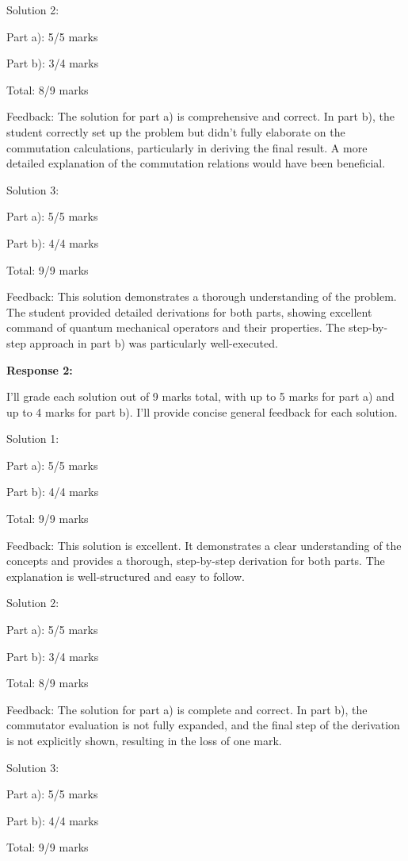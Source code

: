 \documentclass[a4paper,11pt]{article}
\begin{document}
Solution 2:

Part a): 5/5 marks

Part b): 3/4 marks

Total: 8/9 marks

Feedback: The solution for part a) is comprehensive and correct. In part b), the student correctly set up the problem but didn't fully elaborate on the commutation calculations, particularly in deriving the final result. A more detailed explanation of the commutation relations would have been beneficial.

Solution 3:

Part a): 5/5 marks

Part b): 4/4 marks

Total: 9/9 marks

Feedback: This solution demonstrates a thorough understanding of the problem. The student provided detailed derivations for both parts, showing excellent command of quantum mechanical operators and their properties. The step-by-step approach in part b) was particularly well-executed.

\bigskip   
\textbf{Response 2:}

I'll grade each solution out of 9 marks total, with up to 5 marks for part a) and up to 4 marks for part b). I'll provide concise general feedback for each solution.

Solution 1:

Part a): 5/5 marks

Part b): 4/4 marks

Total: 9/9 marks

Feedback: This solution is excellent. It demonstrates a clear understanding of the concepts and provides a thorough, step-by-step derivation for both parts. The explanation is well-structured and easy to follow.

Solution 2:

Part a): 5/5 marks

Part b): 3/4 marks

Total: 8/9 marks

Feedback: The solution for part a) is complete and correct. In part b), the commutator evaluation is not fully expanded, and the final step of the derivation is not explicitly shown, resulting in the loss of one mark.

Solution 3:

Part a): 5/5 marks

Part b): 4/4 marks

Total: 9/9 marks
\end{document}
